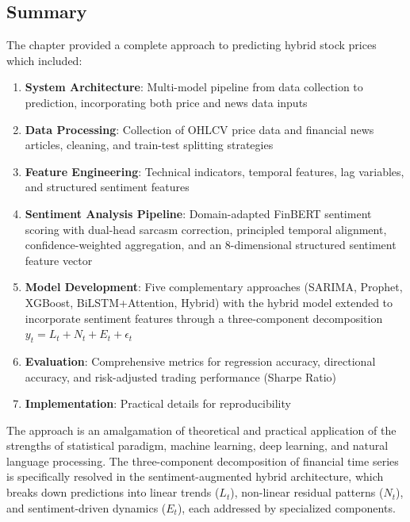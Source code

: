 \documentclass[12pt,a4paper]{article}
\begin{document}
\subsection{Summary}

The chapter provided a complete approach to predicting hybrid stock prices which included:

\begin{enumerate}
    \item \textbf{System Architecture}: Multi-model pipeline from data collection to prediction, incorporating both price and news data inputs
    \item \textbf{Data Processing}: Collection of OHLCV price data and financial news articles, cleaning, and train-test splitting strategies
    \item \textbf{Feature Engineering}: Technical indicators, temporal features, lag variables, and structured sentiment features
    \item \textbf{Sentiment Analysis Pipeline}: Domain-adapted FinBERT sentiment scoring with dual-head sarcasm correction, principled temporal alignment, confidence-weighted aggregation, and an 8-dimensional structured sentiment feature vector
    \item \textbf{Model Development}: Five complementary approaches (SARIMA, Prophet, XGBoost, BiLSTM+Attention, Hybrid) with the hybrid model extended to incorporate sentiment features through a three-component decomposition $y_t = L_t + N_t + E_t + \epsilon_t$
    \item \textbf{Evaluation}: Comprehensive metrics for regression accuracy, directional accuracy, and risk-adjusted trading performance (Sharpe Ratio)
    \item \textbf{Implementation}: Practical details for reproducibility
\end{enumerate}

The approach is an amalgamation of theoretical and practical application of the strengths of statistical paradigm, machine learning, deep learning, and natural language processing. The three-component decomposition of financial time series is specifically resolved in the sentiment-augmented hybrid architecture, which breaks down predictions into linear trends ($L_t$), non-linear residual patterns ($N_t$), and sentiment-driven dynamics ($E_t$), each addressed by specialized components.

\newpage
\clearpage



\newpage
\clearpage



\end{document}
